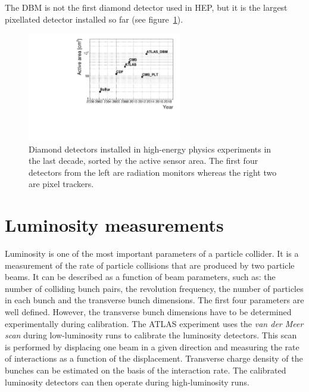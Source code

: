 \documentclass[12pt]{packages/mytustyle}  %
\begin{document}
The DBM is not the first diamond detector used in HEP, but it is the largest pixellated detector installed so far (see figure~\ref{fig:areavsyear}).
\begin{figure}[!t]
\centering
\includegraphics[width=0.6\textwidth]{../../scripts/4_charge_monitoring/plots/detArea}
\caption{Diamond detectors installed in high-energy physics experiments in the last decade, sorted by the active sensor area. The first four detectors from the left are radiation monitors whereas the right two are pixel trackers.}
\label{fig:areavsyear}
\end{figure}

\section{Luminosity measurements}
\label{sec:lummeas}
 \label{sec:lumi}
Luminosity is one of the most important parameters of a particle collider. It is a measurement of the rate of particle collisions that are produced by two particle beams. It can be described as a function of beam parameters, such as: the number of colliding bunch pairs, the revolution frequency, the number of particles in each bunch and the transverse bunch dimensions. The first four parameters are well defined. However, the transverse bunch dimensions have to be determined experimentally during calibration. The ATLAS experiment uses the \emph{van der Meer scan} \cite{} during low-luminosity runs to calibrate the luminosity detectors. This scan is performed by displacing one beam in a given direction and measuring the rate of interactions as a function of the displacement. Transverse charge density of the bunches can be estimated on the basis of the interaction rate. The calibrated luminosity detectors can then operate during high-luminosity runs.
\end{document}
